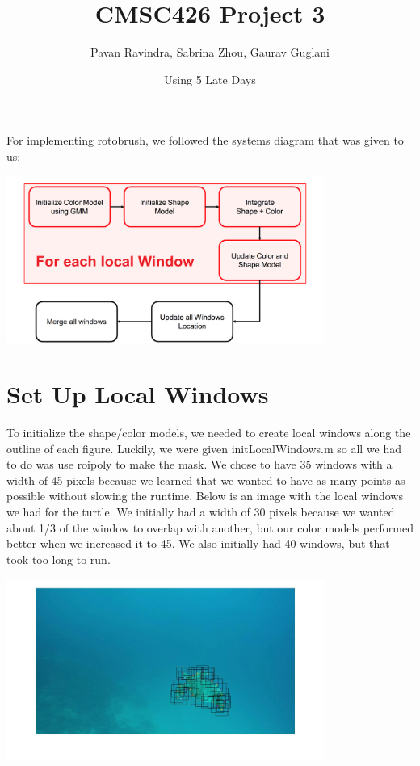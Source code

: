 \documentclass{article}
\title{CMSC426 Project 3}
\author{Pavan Ravindra, Sabrina Zhou, Gaurav Guglani}
\date{Using 5 Late Days}
\begin{document}
	
	
	\maketitle
	
	For implementing rotobrush, we followed the systems diagram that was given to us:
	
	\begin{center}
		\includegraphics[width=104mm]{img/i1}
	\end{center}
	
	\section{Set Up Local Windows}
	To initialize the shape/color models, we needed to create local windows along the outline of each figure. Luckily, we were given initLocalWindows.m so all we had to do was use roipoly to make the mask. We chose to have 35 windows with a width of 45 pixels because we learned that we wanted to have as many points as possible without slowing the runtime. Below is an image with the local windows we had for the turtle. We initially had a width of 30 pixels because we wanted about 1/3 of the window to overlap with another, but our color models performed better when we increased it to 45. We also initially had 40 windows, but that took too long to run. 
	
	\begin{center}
		\includegraphics[width=104mm]{img/i2}
	\end{center}
\end{document}
